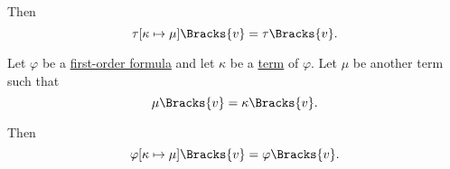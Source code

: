 \begin{proposition}
\begin{thmenum}
    Then
    \begin{equation}\label{eq:thm:first_order_substitution_equivalence/term_in_term}
      \tau[\kappa \mapsto \mu]\Bracks{v} = \tau\Bracks{v}.
    \end{equation}

     Let \( \varphi \) be a \hyperref[def:first_order_syntax/formula]{first-order formula} and let \( \kappa \) be a \hyperref[def:first_order_syntax/formula_terms]{term} of \( \varphi \). Let \( \mu \) be another term such that
    \begin{equation}\label{eq:thm:first_order_substitution_equivalence/term_in_formula/compatibility}
      \mu\Bracks{v} = \kappa\Bracks{v}.
    \end{equation}

    Then
    \begin{equation}\label{eq:thm:first_order_substitution_equivalence/term_in_formula}
      \varphi[\kappa \mapsto \mu]\Bracks{v} = \varphi\Bracks{v}.
    \end{equation}
  \end{thmenum}
\end{proposition}
